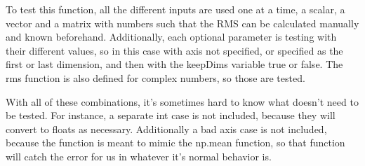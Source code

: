 \documentclass[12pt]{article}
\begin{document}
To test this function, all the different inputs are used one at a time, a scalar, a vector and a matrix with numbers such that the RMS can be calculated manually and known beforehand.  Additionally, each optional parameter is testing with their different values, so in this case with axis not specified, or specified as the first or last dimension, and then with the keepDims variable true or false.  The rms function is also defined for complex numbers, so those are tested.

With all of these combinations, it's sometimes hard to know what doesn't need to be tested.  For instance, a separate int case is not included, because they will convert to floats as necessary.  Additionally a bad axis case is not included, because the function is meant to mimic the np.mean function, so that function will catch the error for us in whatever it's normal behavior is.
\end{document}
